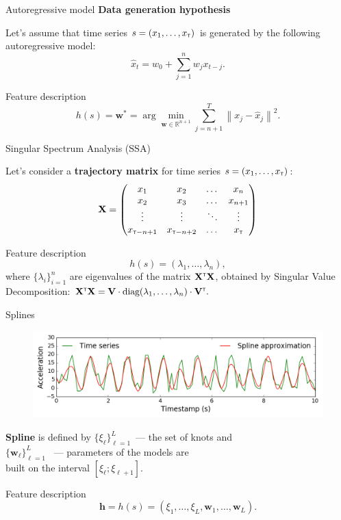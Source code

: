 \documentclass{beamer}
\newcommand{\T}{{\text{\tiny\sffamily\upshape\mdseries T}}}
\begin{document}
\begin{frame}{Autoregressive model}
	\textbf{Data generation hypothesis}
	
		Let's assume that time series $s = (x_1, \dots, x_\T)$ is generated by the following autoregressive model:
		\[
			\widehat{x}_t = w_0 + \sum_{j=1}^n w_j x_{t-j}.
		\]
	\vfill
	\begin{block}{Feature description}
		\[
			h(s) = \mathbf{w}^* = \arg \min_{\mathbf{w} \in \mathbb{R}^{n+1}} \sum_{j=n+1}^{T} \left\| x_j - \hat{x}_j \right\|^2.
		\]
	\end{block}
\end{frame}
\begin{frame}{Singular Spectrum Analysis (SSA)}
	
	Let's consider a \textbf{trajectory matrix} for time series $s = (x_1, \dots, x_\T)$:
	\[
		\mathbf{X} = 
		\begin{pmatrix}
			x_1 & x_2 & \dots & x_n \\
			x_2 & x_3 & \dots & x_{n+1} \\
			\vdots & \vdots & \ddots & \vdots\\
			x_{\T-n+1} & x_{\T-n+2} & \dots & x_{\T}
		\end{pmatrix}
	\]
	\vfill
	\begin{block}{Feature description}
		\[
			h(s) = \left(\lambda_1, \dots ,\lambda_n\right),
		\]
		where $\{\lambda_i\}_{i=1}^n$ are eigenvalues of the matrix $\mathbf{X}^{\T} \mathbf{X}$, obtained by Singular Value Decomposition:
		$
			\mathbf{X}^{\T} \mathbf{X} = \mathbf{V} \cdot \text{diag} (\lambda_1, \dots, \lambda_n) \cdot \mathbf{V}^{\T}.
		$
	\end{block}

\end{frame}
\begin{frame}{Splines}
	\begin{figure}[h]
		\centering
		\includegraphics[width=1\linewidth]{spline_example.png}
	\end{figure}
	\vfill
	\textbf{Spline} is defined by $\{\xi_\ell\}_{\ell=1}^L$~--- the set of knots and\\ \hspace{3.33cm}$\{\mathbf{w}_\ell\}_{\ell=1}^L$ ~--- parameters of the models are\\ \hspace{5.44cm}built on the interval $[\xi_\ell; \xi_{\ell + 1}]$.
	\vfill
	\begin{block}{Feature description}
		\[
		\bm{h} = h(s) = (\xi_1, \dots, \xi_L, \mathbf{w}_1, \dots, \mathbf{w}_L).
		\]
	\end{block}
\end{frame}
\end{document}
